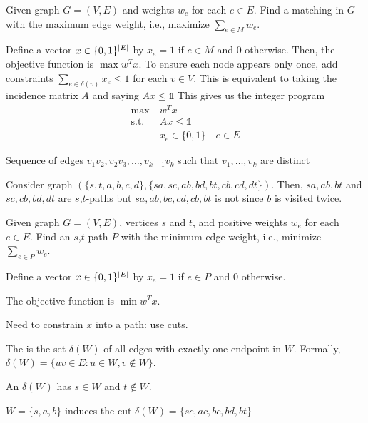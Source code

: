 \documentclass[class=co250,tikz,notes]{agony}
\begin{document}
\begin{example}
  Given graph $G = (V, E)$ and weights $w_e$ for each $e \in E$. Find a matching in $G$ with the maximum edge weight, i.e., maximize $\sum_{e \in M} w_e$.
\end{example}
\begin{sol}
  Define a vector $x \in \{0,1\}^{\abs{E}}$ by $x_e = 1$ if $e \in M$ and $0$ otherwise.
  Then, the objective function is $\max w^T x$.
  To ensure each node appears only once, add constraints $\sum_{e \in \delta(v)} x_e \leq 1$ for each $v \in V$. This is equivalent to taking the incidence matrix $A$ and saying $Ax \leq \mathbb{1}$
  This gives us the integer program
  \begin{align*}
    \max\         & w^T x                         \\
    \text{s.t.}\  & Ax \leq \mathbb{1}            \\
                  & x_e \in \{0,1\} \quad e \in E
  \end{align*}
\end{sol}

\begin{defn}[$v_1$,$v_k$-path]
  Sequence of edges $v_1v_2, v_2v_3, \dotsc, v_{k-1}v_k$ such that $v_1,\dotsc,v_k$ are distinct
\end{defn}
\begin{example}
  Consider graph $(\{s,t,a,b,c,d\}, \{sa,sc,ab,bd,bt,cb,cd,dt\})$. Then, $sa,ab,bt$ and $sc,cb,bd,dt$ are $s$,$t$-paths but $sa,ab,bc,cd,cb,bt$ is not since $b$ is visited twice.
\end{example}


\begin{problem}
  Given graph $G = (V, E)$, vertices $s$ and $t$, and positive weights $w_e$ for each $e \in E$. Find an $s$,$t$-path $P$ with the minimum edge weight, i.e., minimize $\sum_{e \in P} w_e$.
\end{problem}

Define a vector $x \in \{0,1\}^{\abs{E}}$ by $x_e = 1$ if $e \in P$ and $0$ otherwise.

The objective function is $\min w^T x$.

Need to constrain $x$ into a path: use cuts.

\begin{defn}[cut]
  The  is the set $\delta(W)$ of all edges with exactly one endpoint in $W$.
  Formally, $\delta(W) = \{uv \in E : u \in W, v \not\in W\}$.

  An  $\delta(W)$ has $s \in W$ and $t \not\in W$.
\end{defn}
\begin{example}
  $W=\{s,a,b\}$ induces the cut $\delta(W) = \{sc,ac,bc,bd,bt\}$
\end{example}
\end{document}
